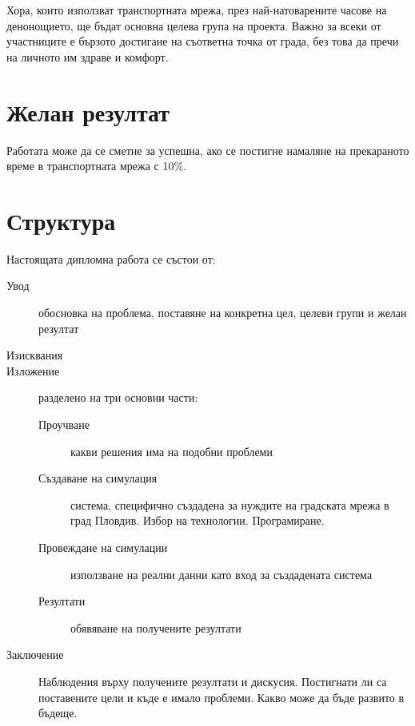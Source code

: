 Хора, които използват транспортната мрежа, през най-натоварените часове на денонощието, ще бъдат основна целева група на проекта. Важно за всеки от участниците е бързото достигане на съответна точка от града, без това да пречи на личното им здраве и комфорт.

\section{Желан резултат}

Работата може да се сметне за успешна, ако се постигне намаляне на прекараното време в транспортната мрежа с 10\%.

\section{Структура}

Настоящата дипломна работа се състои от:

\begin{description}

\item[Увод] обосновка на проблема, поставяне на конкретна цел, целеви групи и желан резултат

\item[Изисквания]

\item[Изложение] разделено на три основни части:

\begin{description}

\item[Проучване] какви решения има на подобни проблеми
\item[Създаване на симулация] система, специфично създадена за нуждите на градската мрежа в град Пловдив. Избор на технологии. Програмиране.
\item[Провеждане на симулации] използване на реални данни като вход за създадената система
\item[Резултати] обявяване на получените резултати

\end{description}

\item[Заключение] Наблюдения върху получените резултати и дискусия. Постигнати ли са поставените цели и къде е имало проблеми. Какво може да бъде развито в бъдеще.
\end{description}